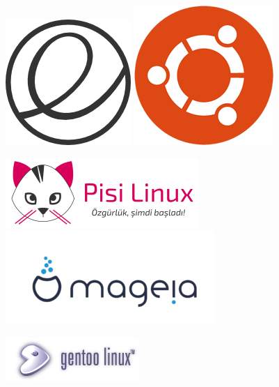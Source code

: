 \begin{figure}[ht!]
	\includegraphics[width=0.2\paperwidth]{./img/linux/elementary}
	
	\includegraphics[width=0.2\paperwidth]{./img/linux/ubuntu}
	
	
	\includegraphics[width=0.2\paperwidth]{./img/linux/pisi}
	\includegraphics[width=0.2\paperwidth]{./img/linux/mageia}
	
	\includegraphics[width=0.2\paperwidth]{./img/linux/gentoo}

\end{figure}
